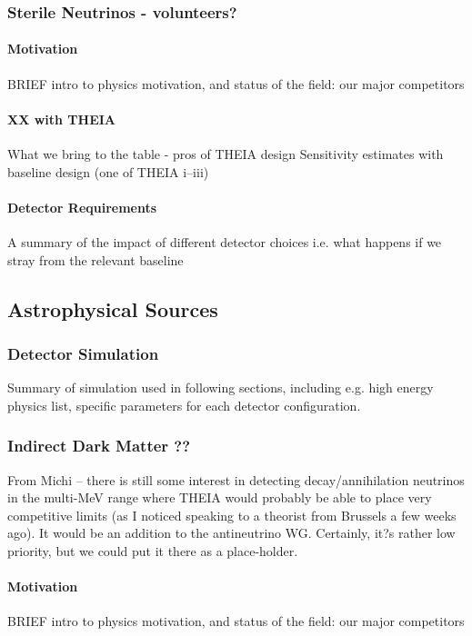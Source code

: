 \documentclass[11pt,prd,letterpaper,amsmath,amssymb,final,nofootinbib
,unsortedaddress,superscriptaddress
]{revtex4-1}
\begin{document}



\subsubsection{Sterile Neutrinos - \bf volunteers?}
\paragraph{Motivation}
BRIEF intro to physics motivation, and status of the field: our major competitors
\paragraph{XX with THEIA}
What we bring to the table - pros of THEIA design \newline
Sensitivity estimates with baseline design (one of THEIA i--iii)
\paragraph{Detector Requirements}
A summary of the impact of different detector choices i.e. what happens if we stray from the relevant baseline


\subsection{Astrophysical Sources}
\subsubsection{Detector Simulation}
Summary of simulation used in following sections, including e.g. high energy physics list, specific parameters for each detector configuration.





\subsubsection{Indirect Dark Matter ?? }
From Michi -- there is still some interest in detecting decay/annihilation neutrinos in the multi-MeV range where THEIA would probably be able to place very competitive limits (as I noticed speaking to a theorist from Brussels a few weeks ago). It would be an addition to the antineutrino WG. Certainly, it?s rather low priority, but we could put it there as a place-holder.
\paragraph{Motivation}
BRIEF intro to physics motivation, and status of the field: our major competitors
\end{document}
